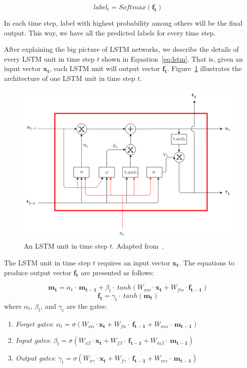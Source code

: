 \begin{equation}
\label{eq:softmaxout}
label_{t} = Softmax(\mathbf{f_{t}})
\end{equation}

In each time step, label with highest probability among others will be the final output. This way, we have all the predicted labels for every time step.

After explaining the big picture of LSTM networks, we describe the details of every LSTM unit in time step $t$ shown in Equation~\ref{eq:lstm}. That is, given an input vector $\mathbf{x_{t}}$, each LSTM unit will output vector $\mathbf{f_{t}}$. Figure~\ref{fig:lstmunit} illustrates the architecture of one LSTM unit in time step $t$.

\begin{figure}
	\centering
	\includegraphics[width=0.85\linewidth]{images/lstmadapted2}
	\caption{An LSTM unit in time step $t$. Adapted from~\citep{skripsiwahid}.}
	\label{fig:lstmunit}
\end{figure}

The LSTM unit in time step $t$ requires an input vector $\mathbf{x_{t}}$. The equations to produce output vector $\mathbf{f_{t}}$ are presented as follows:

\begin{equation}\label{eq:lstmm}
\mathbf{m_{t}}=\alpha_{t}\cdot~\mathbf{m_{t-1}} + \beta_{t}\cdot~tanh(W_{xm} \cdot \mathbf{x_{t}} + W_{fm} \cdot \mathbf{f_{t-1}})
\end{equation}
\begin{equation}\label{eq:lstmh}
\mathbf{f_{t}}=\gamma_{t}\cdot~tanh(\mathbf{m_{t}})
\end{equation}
where
$ \alpha_t $, $ \beta_t $, and $ \gamma_t $ are the gates:
\begin{enumerate}
	\item \textit{Forget gates}: $ \alpha_{t}=\sigma(W_{x\alpha} \cdot \mathbf{x_{t}}+W_{f\alpha}\cdot~\mathbf{f_{t-1}}+W_{m\alpha}\cdot~\mathbf{m_{t-1}}) $
	\item \textit{Input gates}: $ \beta_{t}=\sigma(W_{x\beta}\cdot \mathbf{x_{t}}+W_{f\beta}\cdot~\mathbf{f_{t-1}}+W_{m\beta}\cdot~\mathbf{m_{t-1}}) $
	\item \textit{Output gates}: $ \gamma_{t}=\sigma(W_{x\gamma}\cdot \mathbf{x_{t}}+W_{f\gamma}\cdot~\mathbf{f_{t-1}}+W_{m\gamma}\cdot~\mathbf{m_{t-1}}) $
\end{enumerate}

